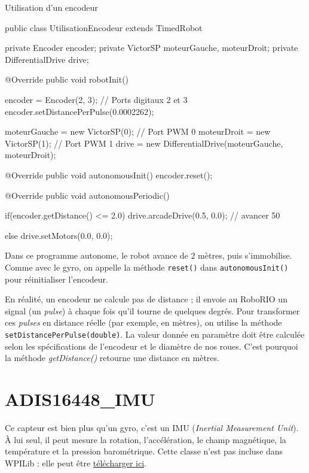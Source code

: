 \documentclass[12pt]{report}
\begin{document}
\begin{MyTCB}{Utilisation d'un encodeur}

public class UtilisationEncodeur extends TimedRobot {

	private Encoder encoder;
	private VictorSP moteurGauche, moteurDroit;
	private DifferentialDrive drive;
	
	@Override
	public void robotInit() {
	
		encoder = Encoder(2, 3); // Ports digitaux 2 et 3
		encoder.setDistancePerPulse(0.0002262);

		moteurGauche = new VictorSP(0); // Port PWM 0
		moteurDroit = new VictorSP(1); // Port PWM 1
		drive = new DifferentialDrive(moteurGauche, moteurDroit);

	}
	
	@Override
	public void autonomousInit() {
		encoder.reset();
	}
	
	@Override
	public void autonomousPeriodic() {

		if(encoder.getDistance() <= 2.0)
			drive.arcadeDrive(0.5, 0.0); // avancer 50%
			
		else
			drive.setMotors(0.0, 0.0);		
		
	}

}

\end{MyTCB}

Dans ce programme autonome, le robot avance de 2 mètres, puis s'immobilise. Comme avec le gyro, on appelle la méthode \texttt{reset()} dans \texttt{autonomousInit()} pour réinitialiser l'encodeur. 

En réalité, un encodeur ne calcule pas de distance ; il envoie au RoboRIO un signal (un \textit{pulse}) à chaque fois qu'il tourne de quelques degrés. Pour transformer ces \textit{pulses} en distance réelle (par exemple, en mètres), on utilise la méthode \texttt{setDistancePerPulse(double)}. La valeur donnée en paramètre doit être calculée selon les spécifications de l'encodeur et le diamètre de nos roues. C'est pourquoi la méthode \textit{getDistance()} retourne une distance en mètres.

\section{ADIS16448\_IMU}\label{adis16448}

Ce capteur est bien plus qu'un gyro, c'est un IMU (\textit{Inertial Measurement Unit}). À lui seul, il peut mesure la rotation, l'accélération, le champ magnétique, la température et la pression barométrique. Cette classe n'est pas incluse dans WPILib : elle peut être \href{https://github.com/juchong/ADIS16448-RoboRIO-Driver/blob/master/Java/src/main/java/com/analog/adis16448/frc/ADIS16448_IMU.java}{télécharger ici}.
\end{document}

